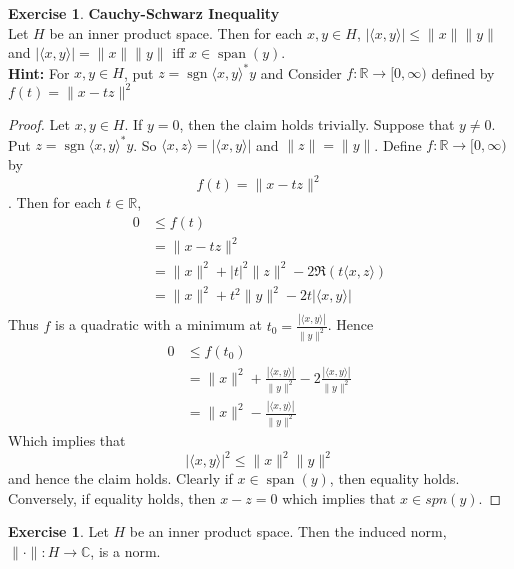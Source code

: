 \documentclass[12pt]{amsart}
\theoremstyle{definition}
\newtheorem{ex}[definition]{Exercise}
\newcommand{\C}{\mathbb{C}}
\newcommand{\R}{\mathbb{R}}
\renewcommand{\r}{\rangle}
\renewcommand{\l}{\langle}
\newcommand{\Rg}{[0,\infty)}
\DeclareMathOperator{\sgn}{sgn}
\DeclareMathOperator{\spn}{span}
\newcommand{\lex}[1]{\label{ex:#1}}
\begin{document}
\begin{ex} \lex{} \textbf{Cauchy-Schwarz Inequality}\\
Let $H$ be an inner product space. Then for each $x,y \in H$, $| \l x, y\r | \leq \|x\| \| y\|$ and $| \l x, y\r | = \|x\| \| y\|$ iff $x \in \spn(y)$. \\
\textbf{Hint:} For $x, y \in H$, put $z = \sgn\l x, y \r^*y$ and Consider $f: \R \rightarrow \Rg$ defined by $f(t) = \|x - tz\|^2$
\end{ex}

\begin{proof}
Let $x,y \in H$. If $y = 0$, then the claim holds trivially. Suppose that $y \neq 0$. Put $z = \sgn\l x, y \r^*y$. So $\l x, z\r = |\l x,y \r |$ and $\|z\| = \|y\|$. Define $f: \R \rightarrow \Rg$ by $$f(t) = \|x - tz\|^2$$. Then for each $t \in \R$, 
\begin{align*}
0 
& \leq f(t) \\
&=  \|x - tz\|^2 \\
&= \|x\|^2 + |t|^2\|z\|^2 - 2 \Re(t \l x,z \r) \\
&= \|x\|^2 + t^2\|y\|^2 - 2 t |\l x,y \r| \\
\end{align*} 
Thus $f$ is a quadratic with a minimum at $t_0 = \frac{|\l x, y \r|}{\|y\|^2}$. Hence 
\begin{align*}
0 
&\leq f(t_0) \\
&= \|x\|^2 +  \frac{|\l x, y \r|}{\|y\|^2} - 2\frac{|\l x, y \r|}{\|y\|^2} \\
& = \|x\|^2 -  \frac{|\l x, y \r|}{\|y\|^2}
\end{align*}
Which implies that $$| \l x, y\r |^2 \leq \|x\|^2 \| y\|^2$$ and hence the claim holds. Clearly if $x \in \spn(y)$, then equality holds. Conversely, if equality holds, then $x-z = 0$ which implies that $x \in spn(y)$.
\end{proof}

\begin{ex} \lex{}
Let $H$ be an inner product space. Then the induced norm, $\| \cdot\|: H \rightarrow \C$, is a norm. 
\end{ex}
\end{document}

